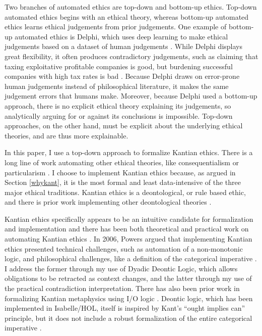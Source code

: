 \begin{isabellebody}
\begin{isamarkuptext}
Two branches of automated ethics are top-down and bottom-up ethics. Top-down automated ethics begins 
with an ethical theory, whereas bottom-up automated ethics learns ethical judgements from prior 
judgements. One example of bottom-up automated ethics is Delphi, which uses deep learning to make 
ethical judgements based on a dataset of human judgements \citep{delphi}. While Delphi displays great 
flexibility, it often produces contradictory judgements, such as claiming that taxing exploitative 
profitable companies is good, but burdening successful companies with high tax rates is bad \citep{verge}. 
Because Delphi draws on error-prone human judgements instead of philosophical literature, it makes 
the same judgement errors that humans make. Moreover, because Delphi used a bottom-up approach, 
there is no explicit ethical theory explaining its judgements, so analytically arguing for or 
against its conclusions is impossible. Top-down approaches, on the other hand, must be explicit about 
the underlying ethical theories, and are thus more explainable. 

In this paper, I use a top-down approach to formalize Kantian ethics. There is a long line of work 
automating other ethical theories, like consequentialism \citep{util1, util2} or particularism 
\citep{particularism1, particularism2}. I choose to implement Kantian ethics because, as argued in 
Section \ref{whykant}, it is the most formal and least data-intensive of the three major ethical 
traditions. Kantian ethics is a deontological, or rule based ethic, and there is prior work 
implementing other deontological theories \citep{dde, deon1, deon2}. 

Kantian ethics specifically appears to be an intuitive candidate for formalization and implementation 
and there has been both theoretical and practical work on automating Kantian ethics \citep{powers, lin}. 
In 2006, Powers argued that implementing Kantian ethics presented technical challenges, 
such as automation of a non-monotonic logic, and philosophical challenges, like a definition of the 
categorical imperative \citep{powers}. I address the former through my use of Dyadic Deontic Logic, which allows 
obligations to be retracted as context changes, and the latter through my use of the practical 
contradiction interpretation. There has also been prior work in formalizing Kantian metaphysics 
using I/O logic \citep{io}. Deontic logic, which has been implemented in Isabelle/HOL, itself is inspired 
by Kant's ``ought implies can'' principle, but it does not include a robust formalization of the entire 
categorical imperative \citep{cresswell}.


\end{isamarkuptext}
\end{isabellebody}
